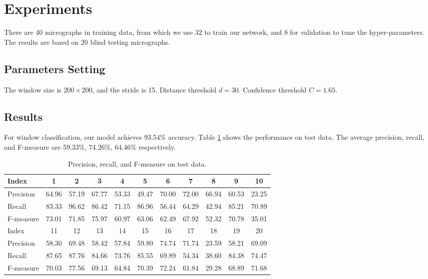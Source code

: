 \documentclass[11pt]{article}
\begin{document}
\section{Experiments}
There are 40 micrographs in training data, from which we use 32 to train our network, and 8 for validation to tune the hyper-parameters. The results are based on 20 blind testing micrographs.

\subsection{Parameters Setting}
The window size is $200\times 200$, and the stride is 15. Distance threshold $d=30$. Confidence threshold $C=1.65$. 

\subsection{Results}
For window classification, our model achieves 93.54\% accuracy. Table \ref{performance} shows the performance on test data. The average precision, recall, and F-measure are 59.33\%, 74.26\%, 64.46\% respectively.

\begin{table}[htbp]
\begin{center}
\begin{tabular}{lcccccccccc}
\toprule
Index & 1 & 2 & 3 & 4 & 5 & 6 & 7 & 8 & 9 & 10\\
\hline
Precision & 64.96 &	57.19 &	67.77 &	53.33 &	49.47 &	70.00 &	72.00 &	66.94 &	60.53 &	23.25\\
Recall    & 83.33 &	96.62 &	86.42 &	71.15 &	86.96 &	56.44 &	64.29 &	42.94 &	85.21 &	70.89\\
F-measure & 73.01 &	71.85 &	75.97 &	60.97 &	63.06 &	62.49 &	67.92 &	52.32 &	70.78 &	35.01\\
\toprule
Index & 11 & 12 & 13 & 14 & 15 & 16 & 17 & 18 & 19 & 20\\
\hline
Precision & 58.30 &	69.48 &	58.42 &	57.84 &	59.80 &	74.74 &	71.74 &	23.59 &	58.21 &	69.09\\
Recall    & 87.65 &	87.76 &	84.66 &	73.76 &	85.55 &	69.89 &	54.34 &	38.60 &	84.38 &	74.47\\
F-measure & 70.03 &	77.56 &	69.13 &	64.84 &	70.39 &	72.24 &	61.84 &	29.28 &	68.89 &	71.68\\
\toprule
\end{tabular}
\end{center}
\caption{Precision, recall, and F-measure on test data.}\label{performance}
\end{table}
\end{document}
